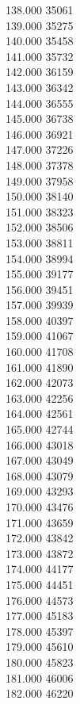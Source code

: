 { 138.000	35061 \\
 139.000	35275 \\
 140.000	35458 \\
 141.000	35732 \\
 142.000	36159 \\
 143.000	36342 \\
 144.000	36555 \\
 145.000	36738 \\
 146.000	36921 \\
 147.000	37226 \\
 148.000	37378 \\
 149.000	37958 \\
 150.000	38140 \\
 151.000	38323 \\
 152.000	38506 \\
 153.000	38811 \\
 154.000	38994 \\
 155.000	39177 \\
 156.000	39451 \\
 157.000	39939 \\
 158.000	40397 \\
 159.000	41067 \\
 160.000	41708 \\
 161.000	41890 \\
 162.000	42073 \\
 163.000	42256 \\
 164.000	42561 \\
 165.000	42744 \\
 166.000	43018 \\
 167.000	43049 \\
 168.000	43079 \\
 169.000	43293 \\
 170.000	43476 \\
 171.000	43659 \\
 172.000	43842 \\
 173.000	43872 \\
 174.000	44177 \\
 175.000	44451 \\
 176.000	44573 \\
 177.000	45183 \\
 178.000	45397 \\
 179.000	45610 \\
 180.000	45823 \\
 181.000	46006 \\
 182.000	46220 \\
}
